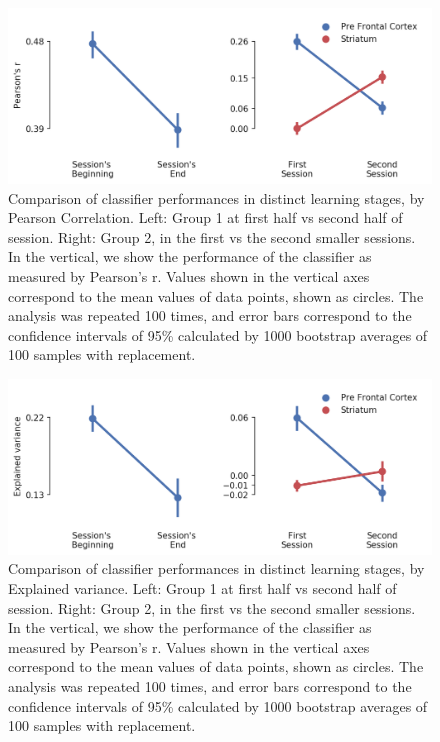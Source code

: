     \begin{figure}[ht]
        \centering
        \includegraphics[width=\textwidth]{figures/pearson_comparison_before_after_learning.png}
        \caption[Comparison of classifier performances in distinct learning stages, by Pearson Correlation]{Comparison of classifier performances in distinct learning stages, by Pearson Correlation. Left: Group 1 at first half vs second half of session. Right: Group 2, in the first vs the second smaller sessions. In the vertical, we show the performance of the classifier as measured by Pearson's r. Values shown in the vertical axes correspond to the mean values of data points, shown as circles. The analysis was repeated 100 times, and error bars correspond to the confidence intervals of 95\% calculated by 1000 bootstrap averages of 100 samples with replacement.}
        \label{fig:evolution_representation_pearson}
    \end{figure}

    \begin{figure}[ht]
        \centering
        \includegraphics[width=\textwidth]{figures/expvar_comparison_before_after_learning.png}
        \caption[Comparison of classifier performances in distinct learning stages, by Explained variance]{Comparison of classifier performances in distinct learning stages, by Explained variance. Left: Group 1 at first half vs second half of session. Right: Group 2, in the first vs the second smaller sessions. In the vertical, we show the performance of the classifier as measured by Pearson's r. Values shown in the vertical axes correspond to the mean values of data points, shown as circles. The analysis was repeated 100 times, and error bars correspond to the confidence intervals of 95\% calculated by 1000 bootstrap averages of 100 samples with replacement.}
        \label{fig:evolution_representation_variance}
    \end{figure}

